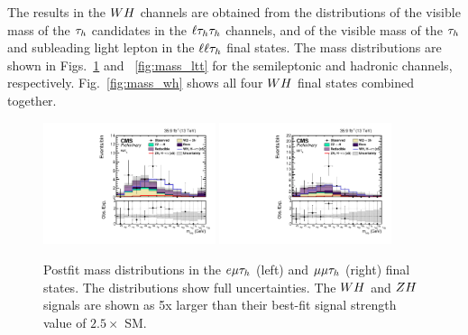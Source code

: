 The results in the $WH$ channels are obtained from the distributions of the 
visible mass of the $\tau_{h}$ candidates in the $\ell\tau_{h}\tau_{h}$ channels, 
and of the visible mass of the $\tau_{h}$ and subleading light lepton in the 
$\ell\ell\tau_{h}$ final states. The mass distributions
are shown in Figs.~\ref{fig:mass_llt} and ~\ref{fig:mass_ltt} for the semileptonic 
and hadronic channels, respectively. Fig.~\ref{fig:mass_wh} shows all
four $WH$ final states combined together.

\begin{figure}[h!]
 \begin{center}
  \includegraphics[width=0.45\textwidth]{higgs_to_taus_vh/plots/wh/emt_postfit.pdf}
  \includegraphics[width=0.45\textwidth]{higgs_to_taus_vh/plots/wh/mmt_postfit.pdf}
 \end{center}
 \caption{Postfit mass distributions in the $e\mu\tau_{h}$ (left) and 
 $\mu\mu\tau_{h}$ (right) final states.
 The distributions show full uncertainties.
 The $WH$ and $ZH$ signals are shown as 5x larger than their best-fit
 signal strength value of $2.5 \times$ SM.
 }
 \label{fig:mass_llt}
\end{figure}

